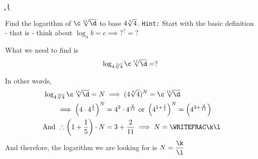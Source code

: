 

\POWER\vbone\vbthree\c
\POWER\vbone\vbfour\d
{}\vbtwo\m\n
\FRACADD{}\vbfour\vbfive\p\q
\FRACDIV\p\q\m\n\k\l
  
\question Find the logarithm of $\c\sqrt[\vbfive]{\d}$ to base $4\sqrt[5]{4}$. 
\texttt{Hint:} Start with the basic definition - that is - think about $\log_a b = c\implies ?^?=?$

\watchout

\begin{solution}
  What we need to find is
  \[ \log_{\vbone\sqrt[\vbtwo]{\vbone}} \c\sqrt[\vbfive]{\d} = ?\]
  
  In other words,
  \begin{align}
    \log_{\vbone\sqrt[\vbtwo]{\vbone}} \c\sqrt[\vbfive]{\d} = N &\implies 
    (\vbone\sqrt[\vbtwo]{\vbone})^N = \c\sqrt[\vbfive]{\d} \\
    \implies \left( \vbone\cdot\vbone^{\frac{1}{\vbtwo}}\right)^N
    &= \vbone^\vbthree\cdot\vbone^{\frac{\vbfour}{\vbfive}} 
    \text{ or } \left( \vbone^{1+\frac{1}{\vbtwo}}\right)^N = 
    \left( \vbone^{\vbthree + \frac{\vbfour}{\vbfive}}\right) \\
    \text{ And }\therefore \left(1 + \dfrac{1}{\vbtwo}\right)\cdot N &= 
    \vbthree + \dfrac{\vbfour}{\vbfive} \implies N = \WRITEFRAC\k\l
  \end{align}
  And therefore, the logarithm we are looking for is $N=\dfrac\k\l$
\end{solution}

